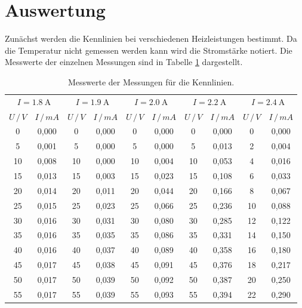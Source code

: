 \section{Auswertung}

Zunächst werden die Kennlinien bei verschiedenen Heizleistungen bestimmt. Da
die Temperatur nicht gemessen werden kann wird die Stromstärke notiert. Die
Messwerte der einzelnen Messungen sind in Tabelle \ref{tab:1} dargestellt.

\begin{table}[H]
  \centering
  \caption{Messwerte der Messungen für die Kennlinien.}
  \label{tab:1}
  \begin{tabular}{c c c c c c c c c c}
\toprule
\multicolumn{2}{c}{$I=\SI{1.8}{\ampere}$} & \multicolumn{2}{c}{$I=\SI{1.9}{\ampere}$} & \multicolumn{2}{c}{$I=\SI{2.0}{\ampere}$} & \multicolumn{2}{c}{$I=\SI{2.2}{\ampere}$} & \multicolumn{2}{c}{$I=\SI{2.4}{\ampere}$}\\
\cmidrule(lr){1-2}\cmidrule(lr){3-4}\cmidrule(lr){5-6}\cmidrule(lr){7-8}\cmidrule(lr){9-10}
$U \, / \, V$ & $I \, / \, mA$ & $U \, / \, V$ & $I \, / \, mA$ &$U \, / \, V$ & $I \, / \, mA$ & $U \, / \, V$ & $I \, / \, mA$ & $U \, / \, V$ & $I \, / \, mA$ \\
\midrule
0   & 0,000 & 0   & 0,000 & 0   & 0,000 & 0   & 0,000 & 0   & 0,000 \\
5   & 0,001 & 5   & 0,000 & 5   & 0,000 & 5   & 0,013 & 2   & 0,004 \\
10  & 0,008 & 10  & 0,000 & 10  & 0,004 & 10  & 0,053 & 4   & 0,016 \\
15  & 0,013 & 15  & 0,003 & 15  & 0,023 & 15  & 0,108 & 6   & 0,033 \\
20  & 0,014 & 20  & 0,011 & 20  & 0,044 & 20  & 0,166 & 8   & 0,067 \\
25  & 0,015 & 25  & 0,023 & 25  & 0,066 & 25  & 0,236 & 10  & 0,088 \\
30  & 0,016 & 30  & 0,031 & 30  & 0,080 & 30  & 0,285 & 12  & 0,122 \\
35  & 0,016 & 35  & 0,035 & 35  & 0,086 & 35  & 0,331 & 14  & 0,150 \\
40  & 0,016 & 40  & 0,037 & 40  & 0,089 & 40  & 0,358 & 16  & 0,180 \\
45  & 0,017 & 45  & 0,038 & 45  & 0,091 & 45  & 0,376 & 18  & 0,217 \\
50  & 0,017 & 50  & 0,039 & 50  & 0,092 & 50  & 0,387 & 20  & 0,250 \\
55  & 0,017 & 55  & 0,039 & 55  & 0,093 & 55  & 0,394 & 22  & 0,290 \\

\end{tabular}
\end{table}
